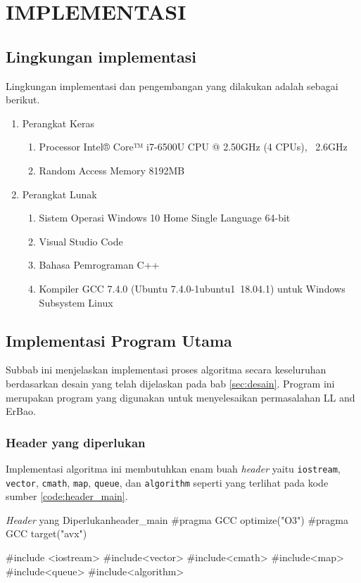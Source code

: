 \chapter {IMPLEMENTASI}

\section{Lingkungan implementasi}

Lingkungan implementasi dan pengembangan yang dilakukan adalah sebagai berikut.
\begin{enumerate}
	\item Perangkat Keras
	\begin{enumerate}
		\item Processor Intel® Core™ i7-6500U CPU @ 2.50GHz (4 CPUs), ~2.6GHz
		\item Random Access Memory 8192MB
	\end{enumerate}
	\item Perangkat Lunak
	\begin{enumerate}
		\item Sistem Operasi Windows 10 Home Single Language 64-bit
		\item Visual Studio Code
		\item Bahasa Pemrograman C++
		\item Kompiler GCC 7.4.0 (Ubuntu 7.4.0-1ubuntu1~18.04.1) untuk Windows Subsystem Linux
	\end{enumerate}
\end{enumerate}

\section{Implementasi Program Utama}

Subbab ini menjelaskan implementasi proses algoritma secara keseluruhan berdasarkan desain yang telah dijelaskan pada bab \ref{sec:desain}. Program ini merupakan program yang digunakan untuk menyelesaikan permasalahan LL and ErBao.

\subsection{Header yang diperlukan}
Implementasi algoritma ini membutuhkan enam buah \textit{header} yaitu \texttt{iostream}, \texttt{vector}, \texttt{cmath}, \texttt{map}, \texttt{queue}, dan \texttt{algorithm} seperti yang terlihat pada kode sumber \ref{code:header_main}.

\newpage
\begin{code}[firstnumber=1]{\textit{Header} yang Diperlukan}{header_main}
#pragma GCC optimize("O3")
#pragma GCC target("avx")

#include <iostream>
#include<vector>
#include<cmath>
#include<map>
#include<queue>
#include<algorithm>
\end{code}


